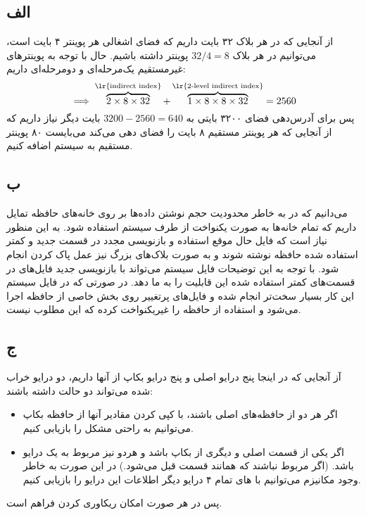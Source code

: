 \subsection*{الف}
از آنجایی که در هر بلاک ۳۲ بایت داریم که فضای اشغالی هر پوینتر ۴ بایت است، می‌توانیم در هر بلاک
$32/4 = 8$
پوینتر داشته باشیم. حال با توجه به پوینترهای غیرمستقیم یک‌مرحله‌ای و دو‌مرحله‌ای داریم:
\[
    \implies \overbrace{2 \times 8 \times 32}^{\text{\lr{indirect index}}} + \overbrace{1 \times 8 \times 8 \times 32}^{\text{\lr{2-level indirect index}}} = 2560
\]
پس برای آدرس‌دهی فضای ۳۲۰۰ بایتی به
$3200 - 2560 = 640$
بایت دیگر نیاز داریم که از آنجایی که هر پوینتر مستقیم ۸ بایت را فضای دهی می‌کند می‌بایست ۸۰ پوینتر مستقیم به سیستم اضافه کنیم.

\subsection*{ب}
می‌دانیم که در
به خاطر محدودیت حجم نوشتن داده‌ها بر روی خانه‌های حافظه تمایل داریم که تمام خانه‌ها به صورت یکنواخت از طرف سیستم استفاده شود. به این منظور نیاز است که فایل حال موقع استفاده و بازنویسی مجدد در قسمت جدید و کمتر استفاده شده حافظه نوشته شوند و به صورت بلاک‌های بزرگ نیز عمل پاک کردن انجام شود. با توجه به این توضیحات فایل سیستم
می‌تواند با بازنویسی جدید فایل‌های در قسمت‌های کمتر استفاده شده این قابلیت را به ما دهد. در صورتی که در فایل سیستم
این کار بسیار سخت‌تر انجام شده و فایل‌های پرتغییر روی بخش خاصی از حافظه اجرا می‌شود و استفاده از حافظه را غیریکنواخت کرده که این مطلوب نیست.

\subsection*{ج}
آز آنجایی که در اینجا پنج درایو اصلی و پنج درایو بکاپ از آنها داریم، دو درایو خراب شده می‌تواند دو حالت داشته باشند:
\begin{itemize}
    \item
    اگر هر دو از حافظه‌های اصلی باشند، با کپی کردن مقادیر آنها از حافظه بکاپ می‌توانیم به راحتی مشکل را بازیابی کنیم.
    \item
    اگر یکی از قسمت اصلی و دیگری از بکاپ باشد و هردو نیز مربوط به یک درایو باشد. (اگر مربوط نباشند که همانند قسمت قبل می‌شود.)
    در این صورت به خاطر وجود مکانیزم
    می‌توانیم با 
    های تمام ۴ درایو دیگر اطلاعات این درایو را بازیابی کنیم.
\end{itemize}
پس در هر صورت امکان ریکاوری کردن فراهم است.